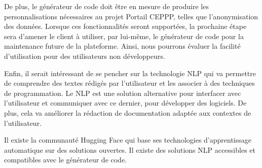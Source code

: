 De plus, le générateur de code doit être en mesure de produire les personnalisations nécessaires au projet Portail CEPPP, telles que l'anonymisation des données. Lorsque ces fonctionnalités seront supportées, la prochaine étape sera d'amener le client à utiliser, par lui-même, le générateur de code pour la maintenance future de la plateforme. Ainsi, nous pourrons évaluer la facilité d'utilisation pour des utilisateurs non développeurs.


Enfin, il serait intéressant de se pencher sur la technologie NLP qui va permettre de comprendre des textes rédigés par l’utilisateur et les associer à des techniques de programmation. Le NLP est une solution alternative pour interfacer avec l’utilisateur et communiquer avec ce dernier, pour développer des logiciels. De plus, cela va améliorer la rédaction de documentation adaptée aux contextes de l'utilisateur. 

Il existe la communauté Hugging Face qui base ses technologies d'apprentissage automatique sur des solutions ouvertes. Il existe des solutions NLP accessibles et compatibles avec le générateur de code.










